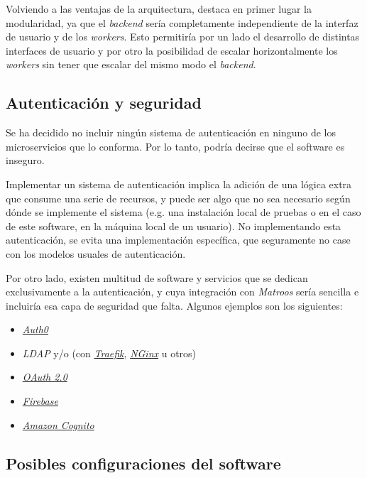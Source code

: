 Volviendo a las ventajas de la arquitectura, destaca en primer lugar la modularidad, ya que el \textit{backend} sería completamente independiente de la interfaz de usuario y de los \textit{workers}. Esto permitiría por un lado el desarrollo de distintas interfaces de usuario y por otro la posibilidad de escalar horizontalmente los \textit{workers} sin tener que escalar del mismo modo el \textit{backend}.


\subsection{Autenticación y seguridad}

Se ha decidido no incluir ningún sistema de autenticación en ninguno de los microservicios que lo conforma. Por lo tanto, podría decirse que el software es inseguro.

Implementar un sistema de autenticación implica la adición de una lógica extra que consume una serie de recursos, y puede ser algo que no sea necesario según dónde se implemente el sistema (e.g. una instalación local de pruebas o en el caso de este software, en la máquina local de un usuario). No implementando esta autenticación, se evita una implementación específica, que seguramente no case con los modelos usuales de autenticación.

Por otro lado, existen multitud de software y servicios que se dedican exclusivamente a la autenticación, y cuya integración con \textit{Matroos} sería sencilla e incluiría esa capa de seguridad que falta. Algunos ejemplos son los siguientes:

\begin{itemize}
	\item \href{https://auth0.com/es}{\textit{Auth0}}
	\item \textit{LDAP} y/o (con \href{https://doc.traefik.io/traefik/}{\textit{Traefik}}, \href{https://www.nginx.com/}{\textit{NGinx}} u otros)
	\item \href{https://oauth.net/2/}{\textit{OAuth 2.0}}
	\item \href{https://firebase.google.com/?hl=es}{\textit{Firebase}}
	\item \href{https://aws.amazon.com/es/cognito/}{\textit{Amazon Cognito}}
\end{itemize}

\subsection{Posibles configuraciones del software}

